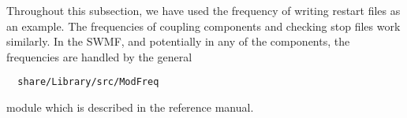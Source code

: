 Throughout this subsection, we have used the frequency of writing restart files
as an example.  The frequencies of coupling components and checking stop
files work similarly. In the SWMF, and potentially in any of the
components, the frequencies are handled by the general
\begin{verbatim}
  share/Library/src/ModFreq
\end{verbatim}
module which is described in the reference manual.

%
